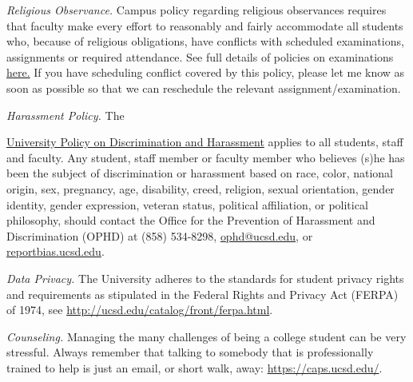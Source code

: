 \documentclass[11pt]{article}
\begin{document}
\smallskip
\noindent \textit{Religious Observance.} Campus
policy regarding religious observances requires that faculty make every effort to reasonably and
fairly accommodate all students who, because of religious obligations, have conflicts with
scheduled examinations, assignments or required attendance. See full
details of policies on examinations \href{https://senate.ucsd.edu/operating-procedures/educational-policies/courses/epc-policies-on-courses/policy-exams-including-midterms-final-exams-and-religious-accommodations-for-exams/}{here.} If you
have scheduling conflict covered by this policy, please let me know as soon as possible so that we can reschedule the
relevant assignment/examination.

\smallskip
\noindent \textit{Harassment Policy.} The {\href{http://ucsd.edu/catalog/front/shpp.html}{University Policy on Discrimination and
Harassment} applies to all students, staff and faculty. Any student, staff member or faculty member who believes (s)he has been the subject of
discrimination or harassment based on race, color, national origin, sex, pregnancy, age, disability, creed, religion, sexual orientation, gender identity, gender expression, veteran status, political affiliation, or political philosophy, should
contact the Office for the Prevention of Harassment and Discrimination (OPHD) at (858) 534-8298, \href{mailto:ophd@ucsd.edu}{ophd@ucsd.edu}, or \href{http://ophd.ucsd.edu/report-bias/index.html}{reportbias.ucsd.edu}.

\smallskip
\begin{sloppypar}
\noindent \textit{Data Privacy.} The University adheres to the standards for student privacy rights and requirements as stipulated
in the Federal Rights and Privacy Act (FERPA) of 1974, see \href{http://ucsd.edu/catalog/front/ferpa.html}{http://ucsd.edu/catalog/front/ferpa.html}.
\end{sloppypar}

\smallskip
\begin{sloppypar}
\noindent \textit{Counseling.} Managing the many challenges of being a college student can be very stressful. Always remember that talking to somebody that is professionally trained to help is just an email, or short walk, away: \href{https://caps.ucsd.edu/}{https://caps.ucsd.edu/}.
\end{sloppypar}


\pagebreak
\begin{center} \textsc{} \end{center}


}
\end{document}
